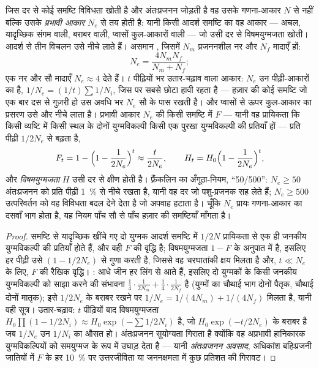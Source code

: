 \begin{theorem}[प्रभावी समष्टि आकार]\label{thm:b3:conservation-biology:ne}
जिस दर से कोई समष्टि विविधता खोती है और अंतःप्रजनन जोड़ती है वह उसके
गणना-आकार $N$ से नहीं बल्कि उसके \emph{प्रभावी आकार} $N_{e}$ से तय होती
है: यानी किसी आदर्श समष्टि का वह आकार --- अचल, यादृच्छिक संगम वाली,
बराबर  वाली, प्वासों कुल-आकारों वाली --- जो उसी दर से
विषमयुग्मजता खोती। आदर्श से तीन विचलन उसे नीचे लाते हैं। असमान , जिसमें $N_{m}$ प्रजननशील नर और $N_{f}$ मादाएँ हों:
\[
N_{e} = \frac{4N_{m}N_{f}}{N_{m} + N_{f}} ;
\]
एक नर और सौ मादाएँ $N_{e} \approx 4$ देते हैं। $t$ पीढ़ियों भर
उतार-चढ़ाव वाला आकार: $N_{e}$ उन पीढ़ी-आकारों का \emph{}
है, $1/N_{e} = (1/t)\sum 1/N_{i}$, जिस पर सबसे छोटा हावी रहता है ---
हज़ार की कोई समष्टि जो एक बार दस से गुज़री हो उस अवधि भर $N_{e}$ सौ के
पास रखती है। और प्वासों से ऊपर कुल-आकार का प्रसरण उसे और नीचे लाता है।
प्रभावी आकार $N_{e}$ की किसी समष्टि में \emph{} $F$ ---
यानी वह प्रायिकता कि किसी व्यष्टि में किसी स्थल के दोनों युग्मविकल्पी
किसी एक पुरखा युग्मविकल्पी की प्रतियाँ हों --- प्रति पीढ़ी $1/2N_{e}$ से
बढ़ता है,
\[
F_{t} = 1 - \Bigl(1 - \frac{1}{2N_{e}}\Bigr)^{t} \approx \frac{t}{2N_{e}},
\qquad H_{t} = H_{0}\Bigl(1 - \frac{1}{2N_{e}}\Bigr)^{t} ,
\]
और \emph{विषमयुग्मजता} $H$ उसी दर से क्षीण होती है। फ़्रैंकलिन का
अँगूठा-नियम, ``50/500'': $N_{e} \ge 50$ अंतःप्रजनन को प्रति पीढ़ी
\qty{1}{\%} से नीचे रखता है, यानी वह दर जो पशु-प्रजनक सह लेते हैं; $N_{e} \ge
500$ उत्परिवर्तन को वह विविधता बदल देने देता है जो अपवाह हटाता है। चूँकि $N_{e}$
प्रायः गणना-आकार का दसवाँ भाग होता है, यह नियम पाँच सौ से पाँच हज़ार की
समष्टियाँ माँगता है।
\end{theorem}
\begin{proof}
समष्टि से यादृच्छिक खींचे गए दो युग्मक आदर्श समष्टि में $1/2N$ प्रायिकता
से एक ही जनकीय युग्मविकल्पी की प्रतियाँ होते हैं, और वही $F$ की वृद्धि
है; विषमयुग्मजता $1 - F$ के अनुपात में है, इसलिए हर पीढ़ी उसे
$(1 - 1/2N_{e})$ से गुणा करती है, जिससे वह चरघातांकी क्षय मिलता है और,
$t \ll N_{e}$ के लिए, $F$ की रैखिक वृद्धि। : आधे जीन हर लिंग
से आते हैं, इसलिए दो युग्मकों के किसी जनकीय युग्मविकल्पी को साझा करने की
संभावना $\tfrac{1}{4}\cdot\tfrac{1}{2N_{m}} +
\tfrac{1}{4}\cdot\tfrac{1}{2N_{f}}$ है (युग्मों का चौथाई भाग दोनों
पैतृक, चौथाई दोनों मातृक); इसे $1/2N_{e}$ के बराबर रखने पर
$1/N_{e} = 1/(4N_{m}) + 1/(4N_{f})$ मिलता है, यानी वही सूत्र।
उतार-चढ़ाव: $t$ पीढ़ियों बाद विषमयुग्मजता $H_{0}\prod(1 - 1/2N_{i})
\approx H_{0}\exp(-\sum 1/2N_{i})$ है, जो $H_{0}\exp(-t/2N_{e})$ के
बराबर है जब $1/N_{e}$ उन $1/N_{i}$ का औसत हो। अंतःप्रजनन सुयोग्यता गिराता
है क्योंकि वह अप्रभावी हानिकारक युग्मविकल्पियों को समयुग्मज के रूप में
उघाड़ देता है --- यानी \emph{अंतःप्रजनन अवसाद}, अधिकांश बहिःप्रजनी
जातियों में $F$ के हर \qty{10}{\%} पर उत्तरजीविता या जननक्षमता में कुछ
प्रतिशत की गिरावट।
\end{proof}

